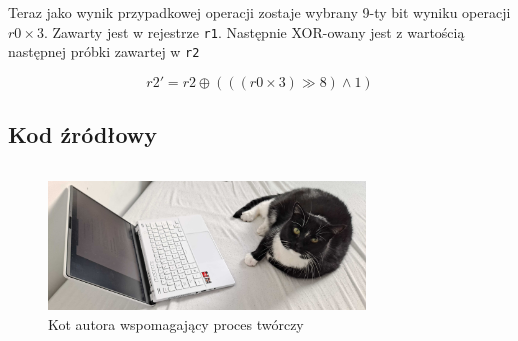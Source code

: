 \documentclass[12pt, a4paper]{article}
\begin{document}
Teraz jako wynik przypadkowej operacji zostaje wybrany 9-ty bit wyniku operacji $r0 \times 3$.
Zawarty jest w rejestrze \verb|r1|. Następnie XOR-owany jest z wartością następnej próbki zawartej w \verb|r2|

\begin{equation}
	r2' = r2 \oplus \left( \left( (r0 \times 3) \gg 8 \right) \wedge 1 \right)
\end{equation}


\subsection{Kod źródłowy}

\inputminted[linenos=true,escapeinside=@@,fontfamily=phv]{asm}{../src/main.S}

\newpage
\printbibliography %

\newpage

\begin{figure}
	\centering
	\includegraphics[width=0.75\textwidth]{img/kot_enter.jpg}
	\caption{Kot autora wspomagający proces twórczy}
\end{figure}
\end{document}

